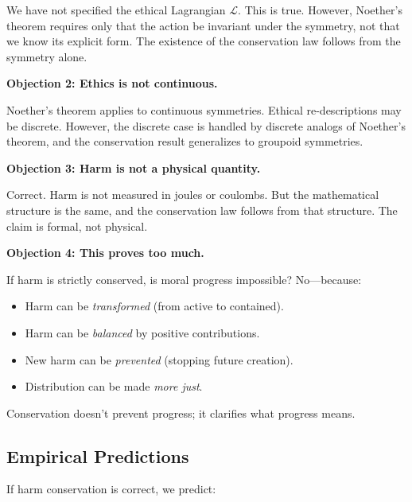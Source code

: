 \documentclass[12pt,letterpaper]{article}
\theoremstyle{definition}
\theoremstyle{remark}
\begin{document}
We have not specified the ethical Lagrangian $\mathcal{L}$. This is true. However, Noether's theorem requires only that the action be invariant under the symmetry, not that we know its explicit form. The existence of the conservation law follows from the symmetry alone.

\textbf{Objection 2: Ethics is not continuous.}

Noether's theorem applies to continuous symmetries. Ethical re-descriptions may be discrete. However, the discrete case is handled by discrete analogs of Noether's theorem, and the conservation result generalizes to groupoid symmetries.

\textbf{Objection 3: Harm is not a physical quantity.}

Correct. Harm is not measured in joules or coulombs. But the mathematical structure is the same, and the conservation law follows from that structure. The claim is formal, not physical.

\textbf{Objection 4: This proves too much.}

If harm is strictly conserved, is moral progress impossible? No---because:
\begin{itemize}
    \item Harm can be \textit{transformed} (from active to contained).
    \item Harm can be \textit{balanced} by positive contributions.
    \item New harm can be \textit{prevented} (stopping future creation).
    \item Distribution can be made \textit{more just}.
\end{itemize}

Conservation doesn't prevent progress; it clarifies what progress means.

\subsection{Empirical Predictions}

If harm conservation is correct, we predict:
\end{document}
